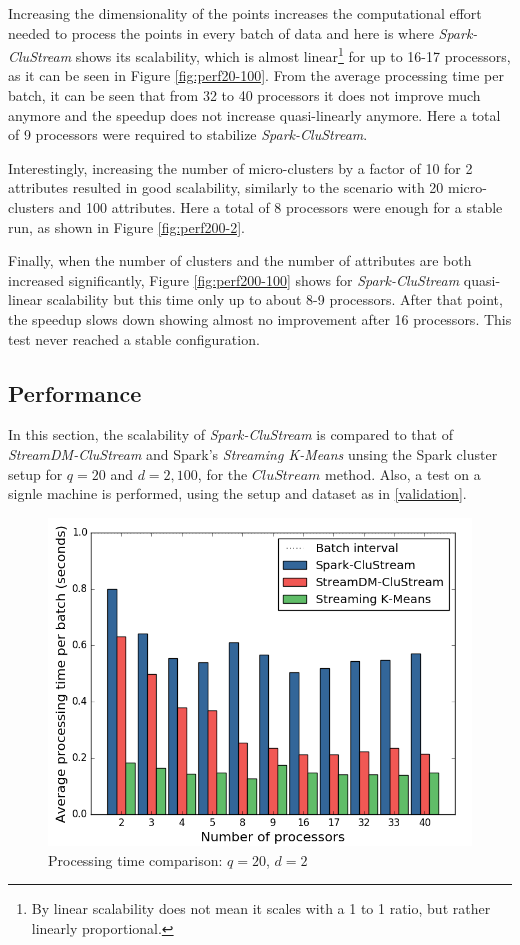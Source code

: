 Increasing the dimensionality of the points increases the computational effort needed to process the points in every batch of data and here is where \textit{Spark-CluStream} shows its scalability, which is almost linear\footnote{By linear scalability does not mean it scales with a 1 to 1 ratio, but rather linearly proportional.} for up to 16-17 processors, as it can be seen in Figure \ref{fig:perf20-100}.  From the average processing time per batch, it can be seen that from 32 to 40 processors it does not improve much anymore and the speedup does not increase quasi-linearly anymore. Here a total of 9 processors were required to stabilize \textit{Spark-CluStream}. 


Interestingly, increasing the number of micro-clusters by a factor of 10 for 2 attributes resulted in good scalability, similarly to the scenario with 20 micro-clusters and 100 attributes. Here a total of 8 processors were enough for a stable run, as shown in Figure \ref{fig:perf200-2}.



Finally, when the number of clusters and the number of attributes are both increased significantly, Figure \ref{fig:perf200-100} shows for \textit{Spark-CluStream} quasi-linear scalability but this time only up to about 8-9 processors. After that point, the speedup slows down showing almost no improvement after 16 processors. This test never reached a stable configuration.


\subsection{Performance}

In this section, the scalability of \textit{Spark-CluStream} is compared to that of \textit{StreamDM-CluStream} and Spark's \textit{Streaming K-Means} unsing the Spark cluster setup for $q=20$ and $d=2,100$, for the $CluStream$ method. Also, a test on a signle machine is performed, using the setup and dataset as in \ref{validation}.


\begin{figure}[h!]
 \centering
 \includegraphics[scale=0.45]{./styles/perfComp2.png}
 \caption{Processing time comparison: $q=20$, $d=2$}
 \label{fig:perfComp2}
\end{figure}

